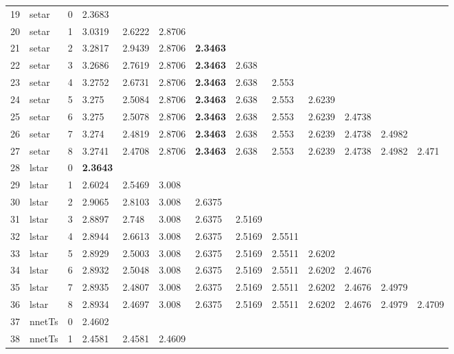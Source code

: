 \documentclass[10pt,a4paper]{article}
\begin{document}
\begin{table}[ht]
\begin{tabular}{rlrllllllllll}
   \hline
19 & setar &     0 & 2.3683 &  &  &  &  &  &  &  &  &  \\ 
  20 & setar &     1 & 3.0319 & 2.6222 & 2.8706 &  &  &  &  &  &  &  \\ 
  21 & setar &     2 & 3.2817 & 2.9439 & 2.8706 & \textbf{2.3463} &  &  &  &  &  &  \\ 
  22 & setar &     3 & 3.2686 & 2.7619 & 2.8706 & \textbf{2.3463} & 2.638 &  &  &  &  &  \\ 
  23 & setar &     4 & 3.2752 & 2.6731 & 2.8706 & \textbf{2.3463} & 2.638 & 2.553 &  &  &  &  \\ 
  24 & setar &     5 & 3.275 & 2.5084 & 2.8706 & \textbf{2.3463} & 2.638 & 2.553 & 2.6239 &  &  &  \\ 
  25 & setar &     6 & 3.275 & 2.5078 & 2.8706 & \textbf{2.3463} & 2.638 & 2.553 & 2.6239 & 2.4738 &  &  \\ 
  26 & setar &     7 & 3.274 & 2.4819 & 2.8706 & \textbf{2.3463} & 2.638 & 2.553 & 2.6239 & 2.4738 & 2.4982 &  \\ 
  27 & setar &     8 & 3.2741 & 2.4708 & 2.8706 & \textbf{2.3463} & 2.638 & 2.553 & 2.6239 & 2.4738 & 2.4982 & 2.471 \\ 
   \hline
28 & lstar &     0 & \textbf{2.3643} &  &  &  &  &  &  &  &  &  \\ 
  29 & lstar &     1 & 2.6024 & 2.5469 & 3.008 &  &  &  &  &  &  &  \\ 
  30 & lstar &     2 & 2.9065 & 2.8103 & 3.008 & 2.6375 &  &  &  &  &  &  \\ 
  31 & lstar &     3 & 2.8897 & 2.748 & 3.008 & 2.6375 & 2.5169 &  &  &  &  &  \\ 
  32 & lstar &     4 & 2.8944 & 2.6613 & 3.008 & 2.6375 & 2.5169 & 2.5511 &  &  &  &  \\ 
  33 & lstar &     5 & 2.8929 & 2.5003 & 3.008 & 2.6375 & 2.5169 & 2.5511 & 2.6202 &  &  &  \\ 
  34 & lstar &     6 & 2.8932 & 2.5048 & 3.008 & 2.6375 & 2.5169 & 2.5511 & 2.6202 & 2.4676 &  &  \\ 
  35 & lstar &     7 & 2.8935 & 2.4807 & 3.008 & 2.6375 & 2.5169 & 2.5511 & 2.6202 & 2.4676 & 2.4979 &  \\ 
  36 & lstar &     8 & 2.8934 & 2.4697 & 3.008 & 2.6375 & 2.5169 & 2.5511 & 2.6202 & 2.4676 & 2.4979 & 2.4709 \\ 
   \hline
37 & nnetTs &     0 & 2.4602 &  &  &  &  &  &  &  &  &  \\ 
  38 & nnetTs &     1 & 2.4581 & 2.4581 & 2.4609 &  &  &  &  &  &  &  \\ 

\end{tabular}
\end{table}
\end{document}
